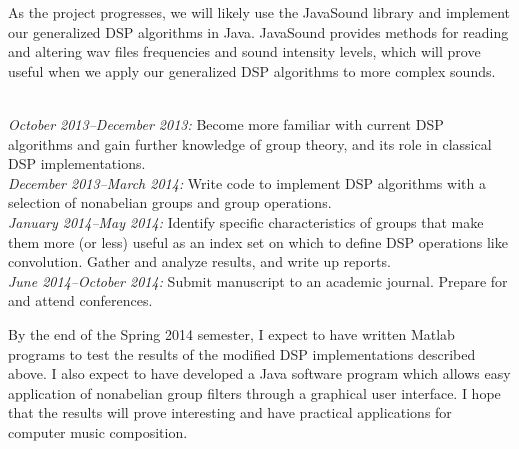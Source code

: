 \documentclass[10pt]{article}
\begin{document}
As the project progresses, we will likely use the JavaSound library and
implement our generalized DSP algorithms in Java.  JavaSound provides methods
for reading and altering wav files frequencies and sound intensity levels, which
will prove useful when we apply our generalized DSP algorithms to more complex
sounds.

\vskip5mm

\\
{\it October 2013--December 2013:} Become more familiar with current DSP algorithms
and gain further knowledge of group theory, and its role in classical DSP
implementations. 
\\[5pt]
{\it December 2013--March 2014:} Write code to implement DSP algorithms with a
selection of nonabelian groups and group operations.  
\\[5pt]
{\it January 2014--May 2014:} 
Identify specific characteristics of groups that make them more (or less)
useful as an index set on which to define DSP operations like convolution.
Gather and analyze results, and write up reports.  
\\[5pt]
{\it June 2014--October 2014:} Submit manuscript to an academic journal.  Prepare
for and attend conferences.

\vskip5mm

By the end of the Spring 2014 semester, I expect to have written Matlab programs
to test the results of the modified DSP implementations described above.  I also
expect to have developed a Java software program which allows easy application
of nonabelian group filters through a graphical user interface.  I hope that the
results will prove interesting and have practical applications for computer
music composition.  
\end{document}

